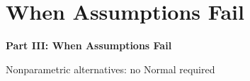 \documentclass[aspectratio=169]{beamer}
\begin{document}
\section{When Assumptions Fail}

\begin{frame}
\begin{center}
  \vspace{1.5cm}
  {\Huge\bfseries\textcolor{popblue}{Part III: When Assumptions Fail}}

  \vspace{0.8cm}
  {\large Nonparametric alternatives: no Normal required}
\end{center}
\end{frame}
\end{document}
